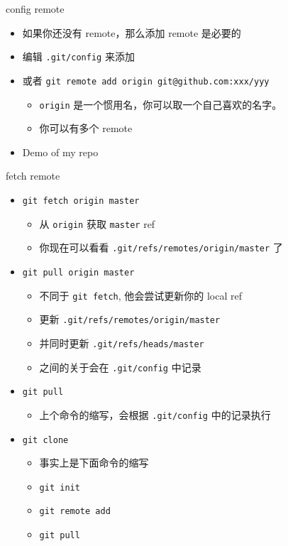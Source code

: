 \documentclass[aspectratio=169]{beamer}
\newcommand{\T}[1]{\texttt{#1}}
\begin{document}
\begin{frame}{config remote}
  \begin{itemize}
    \item 如果你还没有 remote，那么添加 remote 是必要的
    \item 编辑 \T{.git/config} 来添加
    \item 或者 \T{git remote add origin git@github.com:xxx/yyy}\begin{itemize}
      \item \T{origin} 是一个惯用名，你可以取一个自己喜欢的名字。
      \item 你可以有多个 remote
    \end{itemize}
    \item Demo of my repo
  \end{itemize}
\end{frame}

\begin{frame}{fetch remote}
  \begin{itemize}
    \item<1-> \T{git fetch origin master}\begin{itemize}
      \item 从 \T{origin} 获取 \T{master} ref 
      \item 你现在可以看看 \T{.git/refs/remotes/origin/master} 了
    \end{itemize}
    \item<2-> \T{git pull origin master}\begin{itemize}
      \item 不同于 \T{git fetch}, 他会尝试更新你的 local ref
      \item 更新 \T{.git/refs/remotes/origin/master}
      \item 并同时更新 \T{.git/refs/heads/master} 
      \item 之间的关于会在 \T{.git/config} 中记录
    \end{itemize}
    \item<3-> \T{git pull}\begin{itemize}
      \item 上个命令的缩写，会根据 \T{.git/config} 中的记录执行
    \end{itemize}
    \item<4-> \T{git clone}\begin{itemize}
      \item 事实上是下面命令的缩写
      \item \T{git init}
      \item \T{git remote add}
      \item \T{git pull}
    \end{itemize}
  \end{itemize}
\end{frame}
\end{document}
